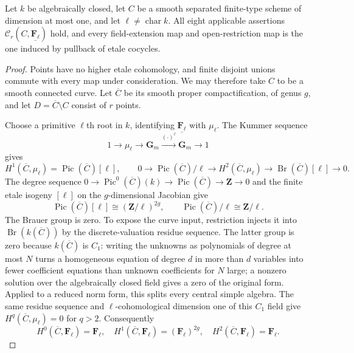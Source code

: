 \begin{lemma}
\label{lemma:weil-pbc-smooth-curve-kummer-localization}
Let $k$ be algebraically closed, let $C$ be a smooth separated finite-type
scheme of dimension at most one, and let
$\ell\ne\operatorname{char}k$.  All eight applicable assertions
$\mathcal C_r(C,\underline{\mathbf F_\ell})$ hold, and every field-extension
map and open-restriction map is the one induced by pullback of etale
cocycles.
\end{lemma}
\begin{proof}
Points have no higher etale cohomology, and finite disjoint unions commute
with every map under consideration.  We may therefore take $C$ to be a
smooth connected curve.  Let $\overline C$ be its smooth proper
compactification, of genus $g$, and let
$D=\overline C\setminus C$ consist of $r$ points.

Choose a primitive $\ell$th root in $k$, identifying
$\underline{\mathbf F_\ell}$ with $\mu_\ell$.  The Kummer sequence
\[
 1\longrightarrow\mu_\ell\longrightarrow\mathbf G_m
 \xrightarrow{(\cdot)^\ell}\mathbf G_m\longrightarrow1
\]
gives
\[
 H^1(\overline C,\mu_\ell)=\operatorname{Pic}(\overline C)[\ell],
 \qquad
 0\to\operatorname{Pic}(\overline C)/\ell
 \to H^2(\overline C,\mu_\ell)\to
 \operatorname{Br}(\overline C)[\ell]\to0.
\]
The degree sequence
$0\to\operatorname{Pic}^0(\overline C)(k)\to
\operatorname{Pic}(\overline C)\to\mathbf Z\to0$
and the finite etale isogeny $[\ell]$ on the $g$-dimensional Jacobian give
\[
 \operatorname{Pic}(\overline C)[\ell]\cong(\mathbf Z/\ell)^{2g},
 \qquad
 \operatorname{Pic}(\overline C)/\ell\cong\mathbf Z/\ell.
\]
The Brauer group is zero.  To expose the curve input, restriction injects it
into $\operatorname{Br}(k(\overline C))$ by the discrete-valuation residue
sequence.  The latter group is zero because $k(\overline C)$ is $C_1$:
writing the unknowns as polynomials of degree at most $N$ turns a homogeneous
equation of degree $d$ in more than $d$ variables into fewer coefficient
equations than unknown coefficients for $N$ large; a nonzero solution over
the algebraically closed field gives a zero of the original form.  Applied
to a reduced norm form, this splits every central simple algebra.  The same
residue sequence and $\ell$-cohomological dimension one of this $C_1$ field
give $H^q(\overline C,\mu_\ell)=0$ for $q>2$.  Consequently
\[
 H^0(\overline C,\mathbf F_\ell)=\mathbf F_\ell,\quad
 H^1(\overline C,\mathbf F_\ell)=(\mathbf F_\ell)^{2g},\quad
 H^2(\overline C,\mathbf F_\ell)=\mathbf F_\ell.
\]


\end{proof}
